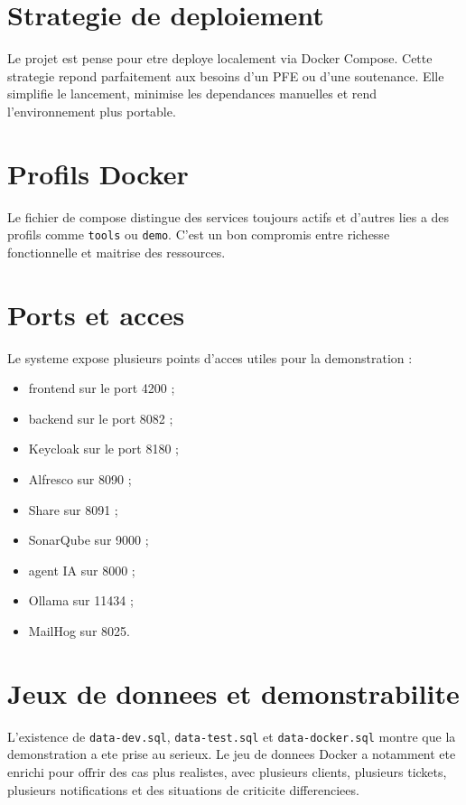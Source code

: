 \documentclass[12pt,a4paper,oneside]{report}
\begin{document}
\section{Strategie de deploiement}

Le projet est pense pour etre deploye localement via Docker Compose. Cette strategie repond parfaitement aux besoins d'un PFE ou d'une soutenance. Elle simplifie le lancement, minimise les dependances manuelles et rend l'environnement plus portable.

\section{Profils Docker}

Le fichier de compose distingue des services toujours actifs et d'autres lies a des profils comme \texttt{tools} ou \texttt{demo}. C'est un bon compromis entre richesse fonctionnelle et maitrise des ressources.

\section{Ports et acces}

Le systeme expose plusieurs points d'acces utiles pour la demonstration :

\begin{itemize}[leftmargin=1.2cm]
  \item frontend sur le port 4200 ;
  \item backend sur le port 8082 ;
  \item Keycloak sur le port 8180 ;
  \item Alfresco sur 8090 ;
  \item Share sur 8091 ;
  \item SonarQube sur 9000 ;
  \item agent IA sur 8000 ;
  \item Ollama sur 11434 ;
  \item MailHog sur 8025.
\end{itemize}

\section{Jeux de donnees et demonstrabilite}

L'existence de \texttt{data-dev.sql}, \texttt{data-test.sql} et \texttt{data-docker.sql} montre que la demonstration a ete prise au serieux. Le jeu de donnees Docker a notamment ete enrichi pour offrir des cas plus realistes, avec plusieurs clients, plusieurs tickets, plusieurs notifications et des situations de criticite differenciees.
\end{document}
